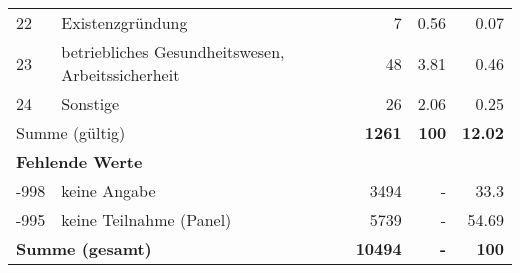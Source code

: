 \begin{longtable}{lXrrr}
        22 & \multicolumn{1}{X}{Existenzgründung} & %
          \num{7} &
          \num[round-mode=places,round-precision=2]{0,56} &
          \num[round-mode=places,round-precision=2]{0,07} \\

        23 & \multicolumn{1}{X}{betriebliches Gesundheitswesen, Arbeitssicherheit} & %
          \num{48} &
          \num[round-mode=places,round-precision=2]{3,81} &
          \num[round-mode=places,round-precision=2]{0,46} \\

        24 & \multicolumn{1}{X}{Sonstige} & %
          \num{26} &
          \num[round-mode=places,round-precision=2]{2,06} &
          \num[round-mode=places,round-precision=2]{0,25} \\

     \midrule
     \multicolumn{2}{l}{Summe (gültig)} &
       \textbf{\num{1261}} &
     \textbf{100} &
       \textbf{\num[round-mode=places,round-precision=2]{12,02}} \\
     \multicolumn{5}{l}{\textbf{Fehlende Werte}}\\
       -998 &
       keine Angabe &
         \num{3494} &
        - &
         \num[round-mode=places,round-precision=2]{33,3} \\
       -995 &
       keine Teilnahme (Panel) &
         \num{5739} &
        - &
         \num[round-mode=places,round-precision=2]{54,69} \\
     \midrule
     \multicolumn{2}{l}{\textbf{Summe (gesamt)}} &
          \textbf{\num{10494}} &
        \textbf{-} &
        \textbf{100} \\
     \bottomrule
     \end{longtable}
     
